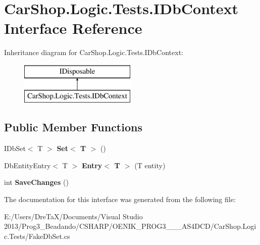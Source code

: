 \hypertarget{interface_car_shop_1_1_logic_1_1_tests_1_1_i_db_context}{}\section{Car\+Shop.\+Logic.\+Tests.\+I\+Db\+Context Interface Reference}
\label{interface_car_shop_1_1_logic_1_1_tests_1_1_i_db_context}
Inheritance diagram for Car\+Shop.\+Logic.\+Tests.\+I\+Db\+Context\+:\begin{figure}[H]
\begin{center}
\leavevmode
\includegraphics[height=2.000000cm]{interface_car_shop_1_1_logic_1_1_tests_1_1_i_db_context}
\end{center}
\end{figure}
\subsection*{Public Member Functions}
\begin{DoxyCompactItemize}
\item 
\mbox{\label{interface_car_shop_1_1_logic_1_1_tests_1_1_i_db_context_aab3ca91c7358bef36a7106e5bc5196ed}} 
I\+Db\+Set$<$ T $>$ {\bfseries Set$<$ T $>$} ()
\item 
\mbox{\label{interface_car_shop_1_1_logic_1_1_tests_1_1_i_db_context_a0b5adda270003bdf2127cfadc0730d56}} 
Db\+Entity\+Entry$<$ T $>$ {\bfseries Entry$<$ T $>$} (T entity)
\item 
\mbox{\label{interface_car_shop_1_1_logic_1_1_tests_1_1_i_db_context_a833baa068db8405c292ebef9e7897439}} 
int {\bfseries Save\+Changes} ()
\end{DoxyCompactItemize}


The documentation for this interface was generated from the following file\+:\begin{DoxyCompactItemize}
\item 
E\+:/\+Users/\+Dre\+Ta\+X/\+Documents/\+Visual Studio 2013/\+Prog3\+\_\+\+Beadando/\+C\+S\+H\+A\+R\+P/\+O\+E\+N\+I\+K\+\_\+\+P\+R\+O\+G3\+\_\+\_\+\_\+\+A\+S4\+D\+C\+D/\+Car\+Shop.\+Logic.\+Tests/Fake\+Db\+Set.\+cs\end{DoxyCompactItemize}
